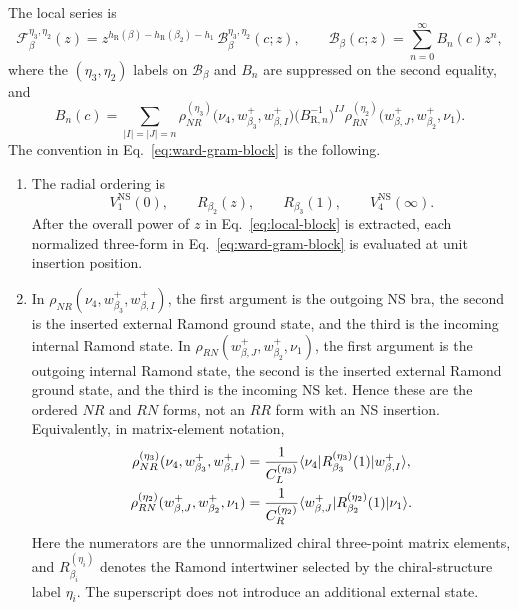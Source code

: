 \documentclass[11pt]{article}
\newcommand{\R}{\mathrm R}
\newcommand{\NS}{\mathrm{NS}}
\newcommand{\F}{\mathcal F}
\newcommand{\B}{\mathcal B}
\begin{document}
The local series is
\begin{equation}
 \F_\beta^{\eta_3,\eta_2}(z)
 =
 z^{h_\R(\beta)-h_\R(\beta_2)-h_1}\,
 \B_\beta^{\eta_3,\eta_2}(c;z),
 \qquad
 \B_\beta(c;z)=\sum_{n=0}^\infty B_n(c)z^n,
 \label{eq:local-block}
\end{equation}
where the \((\eta_3,\eta_2)\) labels on \(\B_\beta\) and \(B_n\) are
suppressed on the second equality, and
\begin{equation}
 B_n(c)=
 \sum_{|I|=|J|=n}
 \rho_{NR}^{(\eta_3)}
   \bigl(\nu_4,w_{\beta_3}^+,w_{\beta,I}^+\bigr)
 \bigl(B_{\R,n}^{-1}\bigr)^{IJ}
 \rho_{RN}^{(\eta_2)}
   \bigl(w_{\beta,J}^+,w_{\beta_2}^+,\nu_1\bigr).
 \label{eq:ward-gram-block}
\end{equation}
The convention in Eq.~\eqref{eq:ward-gram-block} is the following.
\begin{enumerate}
 \item The radial ordering is
 \[
  V^{\NS}_1(0),\qquad R_{\beta_2}(z),\qquad
  R_{\beta_3}(1),\qquad V^{\NS}_4(\infty).
 \]
 After the overall power of \(z\) in Eq.~\eqref{eq:local-block} is
 extracted, each normalized three-form in
 Eq.~\eqref{eq:ward-gram-block} is evaluated at unit insertion
 position.

 \item In \(\rho_{NR}(\nu_4,w_{\beta_3}^+,w_{\beta,I}^+)\), the first
 argument is the outgoing NS bra, the second is the inserted external
 Ramond ground state, and the third is the incoming internal Ramond
 state.  In
 \(\rho_{RN}(w_{\beta,J}^+,w_{\beta_2}^+,\nu_1)\), the first argument
 is the outgoing internal Ramond state, the second is the inserted
 external Ramond ground state, and the third is the incoming NS ket.
 Hence these are the ordered \(NR\) and \(RN\) forms, not an \(RR\)
 form with an NS insertion.  Equivalently, in matrix-element notation,
 \begin{align}
  \rho_{NR}^{(\eta_3)}
   (\nu_4,w_{\beta_3}^+,w_{\beta,I}^+)
  &=\frac{1}{C_L^{(\eta_3)}}
  \langle\nu_4|
    R_{\beta_3}^{(\eta_3)}(1)
   |w_{\beta,I}^+\rangle,
  \notag\\
  \rho_{RN}^{(\eta_2)}
   (w_{\beta,J}^+,w_{\beta_2}^+,\nu_1)
  &=\frac{1}{C_R^{(\eta_2)}}
  \langle w_{\beta,J}^+|
    R_{\beta_2}^{(\eta_2)}(1)
   |\nu_1\rangle.
  \label{eq:rho-matrix-elements}
 \end{align}
 Here the numerators are the unnormalized chiral three-point matrix
 elements, and \(R_{\beta_i}^{(\eta_i)}\) denotes the Ramond
 intertwiner selected by the chiral-structure label \(\eta_i\).  The
 superscript does not introduce an additional external state.


\end{enumerate}
\end{document}
